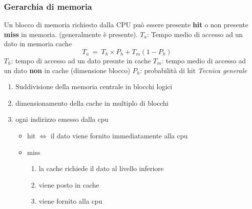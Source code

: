 \documentclass[12pt, a4paper]{article}
\begin{document}
\subsubsection{Gerarchia di memoria}
Un blocco di memoria richiesto dalla CPU può essere presente \textbf{hit} o non presente \textbf{miss} in memoria. (generalmente è presente). \newline
$T_a$: Tempo medio di accesso ad un dato in memoria cache 
\begin{equation} T_a\ =\ T_h \times P_h + T_m(1-P_h) \end{equation}
$T_h$: tempo di accesso ad un dato presnte in cache
$T_m$: tempo medio di accesso ad un dato \textbf{non} in cache (dimensione blocco)
$P_h$: probabilità di hit \newline
\textit{Tecnica generale} \newline
\begin{enumerate}
	\item Suddivisione della memoria centrale in blocchi logici
	\item dimensionamento della cache in multiplo di blocchi
	\item ogni indirizzo emesso dalla cpu
		\begin{itemize}
			\item hit $\iff$ il dato viene fornito immediatamente alla cpu
			\item miss
				\begin{enumerate}
					\item la cache richiede il dato al livello inferiore 
					\item viene posto in cache 
					\item viene fornito alla cpu 
				\end{enumerate}
		\end{itemize}
\end{enumerate}
\end{document}
